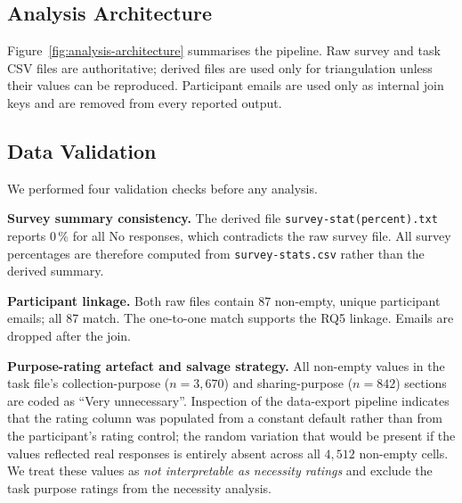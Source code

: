 \documentclass[11pt,a4paper]{article}
\begin{document}
\subsection{Analysis Architecture}
\label{subsec:analysis-architecture}

Figure~\ref{fig:analysis-architecture} summarises the pipeline. Raw
survey and task CSV files are authoritative; derived files are used
only for triangulation unless their values can be reproduced.
Participant emails are used only as internal join keys and are removed
from every reported output.



\subsection{Data Validation}
\label{subsec:data-validation}

We performed four validation checks before any analysis.

\textbf{Survey summary consistency.} The derived file
\texttt{survey-stat(percent).txt} reports 0\,\% for all No responses,
which contradicts the raw survey file. All survey percentages are
therefore computed from \texttt{survey-stats.csv} rather than the
derived summary.

\textbf{Participant linkage.} Both raw files contain 87 non-empty,
unique participant emails; all 87 match. The one-to-one match supports
the RQ5 linkage. Emails are dropped after the join.

\textbf{Purpose-rating artefact and salvage strategy.} All non-empty
values in the task file's collection-purpose ($n=3{,}670$) and
sharing-purpose ($n=842$) sections are coded as ``Very unnecessary''.
Inspection of the data-export pipeline indicates that the rating
column was populated from a constant default rather than from the
participant's rating control; the random variation that would be
present if the values reflected real responses is entirely absent
across all $4{,}512$ non-empty cells. We treat these values as
\emph{not interpretable as necessity ratings} and exclude the task
purpose ratings from the necessity analysis.
\end{document}
